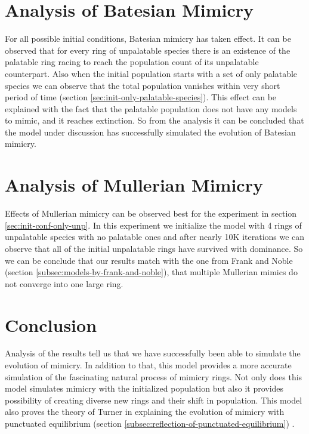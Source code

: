 \section{Analysis of Batesian Mimicry}
For all possible initial conditions, Batesian mimicry has taken effect. It can be observed that for every ring of unpalatable species there is an existence of the palatable ring racing to reach the population count of its unpalatable counterpart. Also when the initial population starts with a set of only palatable species we can observe that the total population vanishes within very short period of time (section \ref{sec:init-only-palatable-species}). This effect can be explained with the fact that the palatable population does not have any models to mimic, and it reaches extinction. So from the analysis it can be concluded that the model under discussion has successfully simulated the evolution of Batesian mimicry.

\section{Analysis of Mullerian Mimicry}
Effects of Mullerian mimicry can be observed best for the experiment in section \ref{sec:init-conf-only-unp}. In this experiment we initialize the model with 4 rings of unpalatable species with no palatable ones and after nearly 10K iterations we can observe that all of the initial unpalatable rings have survived with dominance. So we can be conclude that our results match with the one from Frank and Noble (section \ref{subsec:models-by-frank-and-noble}), that multiple Mullerian mimics do not converge into one large ring.

\section{Conclusion}
Analysis of the results tell us that we have successfully been able to simulate the evolution of mimicry. In addition to that, this model provides a more accurate simulation of the fascinating natural process of mimicry rings. Not only does this model simulates mimicry with the initialized population but also it provides possibility of creating diverse new rings and their shift in population. This model also proves the theory of Turner in explaining the evolution of mimicry with punctuated equilibrium (section \ref{subsec:reflection-of-punctuated-equilibrium}) \cite{turner1988}.